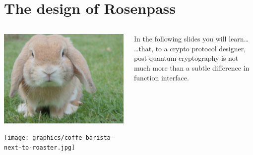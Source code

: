 \section{The design of Rosenpass}

\begin{frame}[light]{}
  \vspace{1cm}
  \large
  \vollkorn

  \begin{columns}[c]
    \begin{column}{.30\linewidth}
      \includegraphics[width=.6\linewidth,right,padding=-.2cm .2cm 0cm .2cm]{graphics/bunny-looking-at-camera.jpg}
      \par
      \texttt{[image: graphics/coffe-barista-next-to-roaster.jpg]}
    \end{column}

    \begin{column}{.40\linewidth}


      In the following slides you will learn…
      \vfil
      …that, to a crypto protocol designer, post-quantum cryptography is not much more than a subtle difference in function interface.
    \end{column}
  \end{columns}
\end{frame}

